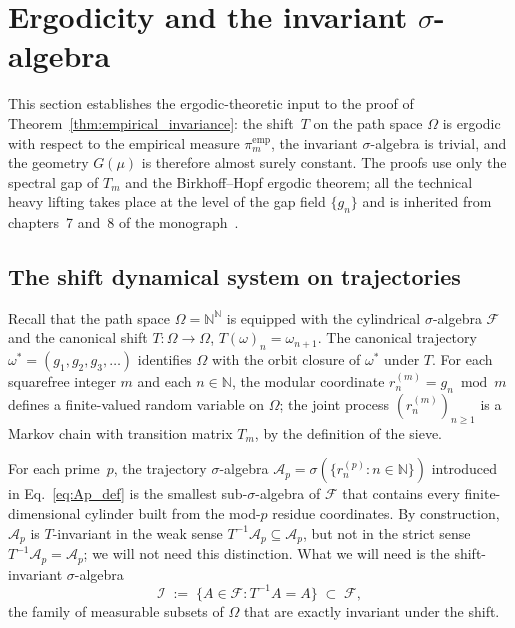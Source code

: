 \section{Ergodicity and the invariant $\sigma$-algebra}
\label{sec:ergodic}

This section establishes the ergodic-theoretic input to the proof
of Theorem~\ref{thm:empirical_invariance}: the shift~$T$ on the
path space $\Omega$ is ergodic with respect to the empirical
measure $\pi_m^{\mathrm{emp}}$, the invariant $\sigma$-algebra is
trivial, and the geometry $G(\mu)$ is therefore almost surely
constant. The proofs use only the spectral gap of $T_m$ and the
Birkhoff--Hopf ergodic theorem; all the technical heavy lifting
takes place at the level of the gap field $\{g_n\}$ and is
inherited from chapters~7 and~8 of the
monograph~\cite{PT_Monograph}.

\subsection{The shift dynamical system on trajectories}
\label{ssec:shift}

Recall that the path space $\Omega = \mathbb{N}^{\mathbb{N}}$ is
equipped with the cylindrical $\sigma$-algebra $\mathcal{F}$ and
the canonical shift $T : \Omega \to \Omega$,
$T(\omega)_n = \omega_{n+1}$. The canonical trajectory
$\omega^\ast = (g_1, g_2, g_3, \ldots)$ identifies $\Omega$ with
the orbit closure of $\omega^\ast$ under $T$. For each squarefree
integer $m$ and each $n \in \mathbb{N}$, the modular coordinate
$r_n^{(m)} = g_n \bmod m$ defines a finite-valued random variable
on $\Omega$; the joint process $(r_n^{(m)})_{n \geq 1}$ is a
Markov chain with transition matrix $T_m$, by the definition of
the sieve.

For each prime~$p$, the trajectory $\sigma$-algebra
$\mathcal{A}_p = \sigma(\{r_n^{(p)} : n \in \mathbb{N}\})$
introduced in Eq.~\eqref{eq:Ap_def} is the smallest
sub-$\sigma$-algebra of $\mathcal{F}$ that contains every
finite-dimensional cylinder built from the mod-$p$ residue
coordinates. By construction, $\mathcal{A}_p$ is $T$-invariant in
the weak sense $T^{-1} \mathcal{A}_p \subseteq \mathcal{A}_p$,
but not in the strict sense $T^{-1} \mathcal{A}_p =
\mathcal{A}_p$; we will not need this distinction. What we will
need is the shift-invariant $\sigma$-algebra
\begin{equation}
  \mathcal{I}
  \;:=\;
  \bigl\{ A \in \mathcal{F} : T^{-1} A = A \bigr\}
  \;\subset\; \mathcal{F},
  \label{eq:I_def}
\end{equation}
the family of measurable subsets of $\Omega$ that are exactly
invariant under the shift.


